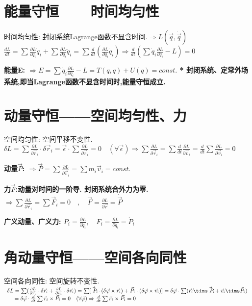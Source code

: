     \section{能量守恒——时间均匀性}
        时间均匀性: 封闭系统Lagrange函数不显含时间.\quad $\Rightarrow L(\vec q,\dot \vec q)$
            $\frac{dL}{dt} = \sum \frac{\partial L}{\partial q_i} \dot q_i + \sum \frac{\partial L}{\partial \dot q_i} \ddot q_i = \sum \frac{d}{dt}(\frac{\partial L}{\partial \dot q_i}\dot q_i) 
            \Rightarrow \frac{d}{dt}(\sum \dot q_i \frac{\partial L}{\partial \dot q_i} - L) = 0$
            
        \bf{能量E}: 
        $\Rightarrow E = \sum \dot q_i \frac{\partial L}{\partial \dot q_i} - L  = T(q,\dot q) + U(q) = const.$
    * 封闭系统、定常外场系统,即当Lagrange函数不显含时间时,能量守恒成立.


    \section{动量守恒——空间均匀性、力}
        空间均匀性: 空间平移不变性.
            $\delta L = \sum \frac{\partial L}{\partial \vec r_i}\cdot \delta \vec r_i = \vec \epsilon \cdot \sum \frac{\partial L}{\partial \vec r_i} = 0\quad(\forall \vec \epsilon)
            \Rightarrow \sum \frac{\partial L}{\partial \vec r_i} = \sum \frac{d}{dt} \frac{\partial L}{\partial \vec v_i} = \frac{d}{dt} \sum \frac{\partial L}{\partial \vec v_i} = 0$
    
        \bf{动量$\vec P$: }
            $\Rightarrow \vec P = \sum \frac{\partial L}{\partial \vec v_i} = \sum m_i \vec v_i = const.$
    
        \bf{力$\vec F$}:动量对时间的一阶导. \quad 封闭系统合外力为零.
            $\Rightarrow \sum \frac{\partial L}{\partial \vec r_i} = \sum \vec F_i = 0 \quad , \quad \vec F = \frac{\partial L}{\partial \vec r} = \dot{ \vec P }$
    
        \bf{广义动量、广义力}:
            $P_i = \frac{\partial L}{\partial \dot q_i},\quad F_i = \frac{\partial L}{\partial \dot q_i} = \dot P_i$


    \section{角动量守恒——空间各向同性}
        空间各向同性: 空间旋转不变性.
            $
            \begin{array}{ll}
            \delta L = \sum (\frac{\partial L}{\partial \vec r_i} \cdot \delta \vec r_i + \frac{\partial L}{\partial \vec v_i} \cdot \delta \vec v_i) = \sum [\dot{\vec P_i} \cdot (\delta \vec \varphi \times \vec r_i) + \vec P_i \cdot ( \delta \vec \varphi \times \vec v_i )]
             = \delta \vec \varphi \cdot \sum (\vec r_i \tims \dot{\vec P_i} + \vec v_i \tims \vec P_i) \\
             \quad\  = \delta \vec \varphi \cdot \frac{d}{dt} \sum \vec r_i \times \vec P_i = 0\quad(\forall \vec \varphi) \Rightarrow \frac{d}{dt}\sum \vec r_i \times \vec P_i = 0
            \end{array}
            $
        
